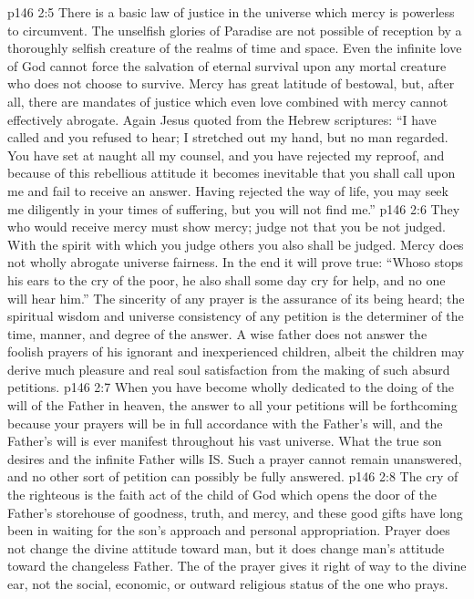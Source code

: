 \pc \vs p146 2:5 \bibnobreakspace There is a basic law of justice in the universe which mercy is powerless to circumvent. The unselfish glories of Paradise are not possible of reception by a thoroughly selfish creature of the realms of time and space. Even the infinite love of God cannot force the salvation of eternal survival upon any mortal creature who does not choose to survive. Mercy has great latitude of bestowal, but, after all, there are mandates of justice which even love combined with mercy cannot effectively abrogate. Again Jesus quoted from the Hebrew scriptures: \textcolor{ubdarkred}{“I have called and you refused to hear; I stretched out my hand, but no man regarded. You have set at naught all my counsel, and you have rejected my reproof, and because of this rebellious attitude it becomes inevitable that you shall call upon me and fail to receive an answer. Having rejected the way of life, you may seek me diligently in your times of suffering, but you will not find me.”}
\pc \vs p146 2:6 \bibnobreakspace They who would receive mercy must show mercy; judge not that you be not judged. With the spirit with which you judge others you also shall be judged. Mercy does not wholly abrogate universe fairness. In the end it will prove true: “Whoso stops his ears to the cry of the poor, he also shall some day cry for help, and no one will hear him.” The sincerity of any prayer is the assurance of its being heard; the spiritual wisdom and universe consistency of any petition is the determiner of the time, manner, and degree of the answer. A wise father does not  answer the foolish prayers of his ignorant and inexperienced children, albeit the children may derive much pleasure and real soul satisfaction from the making of such absurd petitions.
\pc \vs p146 2:7 \bibnobreakspace When you have become wholly dedicated to the doing of the will of the Father in heaven, the answer to all your petitions will be forthcoming because your prayers will be in full accordance with the Father’s will, and the Father’s will is ever manifest throughout his vast universe. What the true son desires and the infinite Father wills IS. Such a prayer cannot remain unanswered, and no other sort of petition can possibly be fully answered.
\pc \vs p146 2:8 \bibnobreakspace The cry of the righteous is the faith act of the child of God which opens the door of the Father’s storehouse of goodness, truth, and mercy, and these good gifts have long been in waiting for the son’s approach and personal appropriation. Prayer does not change the divine attitude toward man, but it does change man’s attitude toward the changeless Father. The  of the prayer gives it right of way to the divine ear, not the social, economic, or outward religious status of the one who prays.

